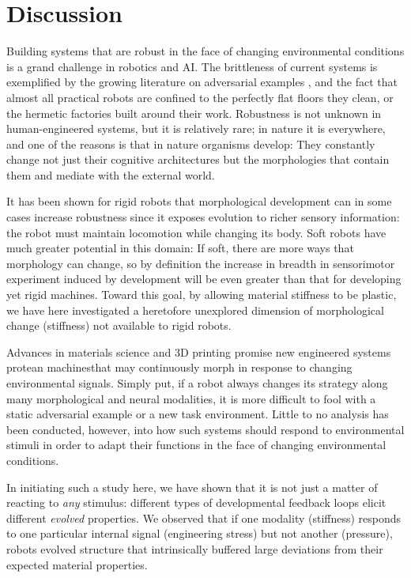\section{Discussion}
\label{sec:discussion}


Building systems that are robust in the face of changing environmental conditions is a grand challenge in robotics and AI.
The brittleness of current systems is exemplified by the growing literature on adversarial examples
\citep{szegedy2013intriguing,
nguyen2015deep,
athalye2017synthesizing}, 
and the fact that almost all practical robots are confined to the perfectly flat floors they clean, or the hermetic factories built around their work.
Robustness is not unknown in human-engineered systems, but it is relatively rare; in nature it is everywhere, and one of the reasons is that in nature organisms develop: 
They constantly change not just their cognitive architectures but the morphologies that contain them and mediate with the external world.

It has been shown for rigid robots \citep{bongard2011morphological}
that morphological development can in some cases increase robustness since it exposes evolution to 
richer sensory information: the robot must maintain locomotion while changing its body. 
Soft robots have much greater potential in this domain:
If soft, there are more ways that morphology can change, so by definition the increase
in breadth in sensorimotor experiment induced by development will be even greater than that
for developing yet rigid machines.
Toward this goal, by allowing material stiffness to be plastic, we have here 
investigated a heretofore unexplored dimension of morphological change (stiffness) not available
to rigid robots.

Advances in materials science and 3D printing promise new engineered systems{\textemdash} protean machines{\textemdash}that may continuously morph in response to changing environmental signals.
Simply put, if a robot always changes its strategy along many morphological and neural modalities, 
it is more difficult to fool with a static adversarial example or a new task environment.
Little to no analysis has been conducted, however, into how such systems should respond to environmental stimuli in order to adapt their functions in the face of changing environmental conditions.

In initiating such a study here, we have shown that it is not just a matter of reacting to \textit{any} stimulus: different types of developmental feedback loops elicit different \textit{evolved} properties.
We observed that if one modality (stiffness) responds to one particular internal signal (engineering stress) but not another (pressure), robots evolved structure that  intrinsically buffered large deviations from their expected material properties.

